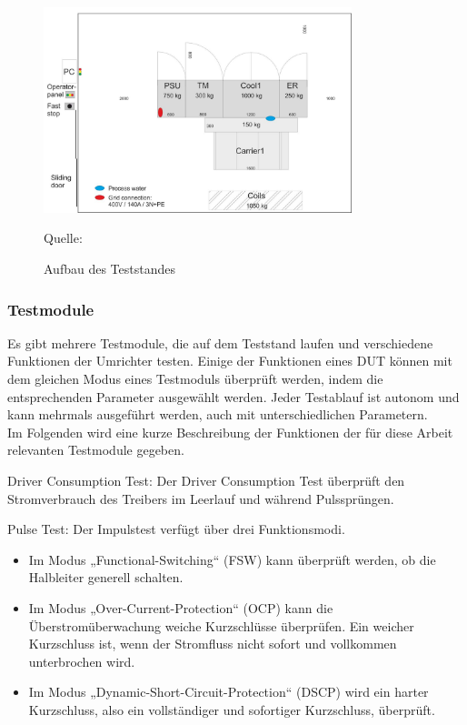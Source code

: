 \begin{figure}[h]
    \centering
    \includegraphics[width=0.8\textwidth]{Grafiken/Test Cabin.jpg}
    \caption{Aufbau des Teststandes}
    \label{fig:1. Aufbau des Teststandes}
    {Quelle: \cite*[7]{Main_Manuel_USTB2018}}
\end{figure}
\subsubsection{Testmodule}
Es gibt mehrere Testmodule, die auf dem Teststand laufen und verschiedene Funktionen der Umrichter testen.
Einige der Funktionen eines DUT können mit dem gleichen Modus eines Testmoduls überprüft werden, indem die entsprechenden Parameter ausgewählt werden.
Jeder Testablauf ist autonom und kann mehrmals ausgeführt werden, auch mit unterschiedlichen Parametern.
\\
Im Folgenden wird eine kurze Beschreibung der Funktionen der für diese Arbeit relevanten Testmodule gegeben.

Driver Consumption Test:
Der Driver Consumption Test überprüft den Stromverbrauch des Treibers im Leerlauf und während Pulssprüngen.

Pulse Test:
Der Impulstest verfügt über drei Funktionsmodi.
\begin{itemize}
    \item Im Modus „Functional-Switching“ (FSW) kann überprüft werden, ob die Halbleiter generell schalten.
    \item Im Modus „Over-Current-Protection“ (OCP) kann die Überstromüberwachung weiche Kurzschlüsse überprüfen.
    Ein weicher Kurzschluss ist, wenn der Stromfluss nicht sofort und vollkommen unterbrochen wird.
    \item Im Modus „Dynamic-Short-Circuit-Protection“ (DSCP) wird ein harter Kurzschluss, also ein vollständiger und sofortiger Kurzschluss, überprüft.
\end{itemize}

